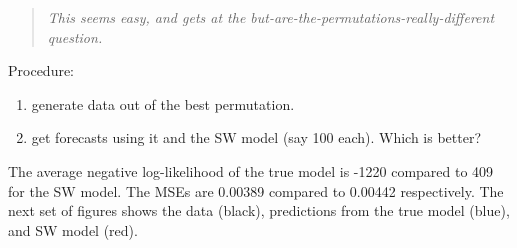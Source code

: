 \documentclass[]{article}
\providecommand{\tightlist}{%
  \setlength{\itemsep}{0pt}\setlength{\parskip}{0pt}}
\begin{document}
\begin{quotation} {\em This seems easy, and gets at the but-are-the-permutations-really-different question.}
\end{quotation}

Procedure:

\begin{enumerate}
\def\labelenumi{\arabic{enumi}.}
\tightlist
\item
  generate data out of the best permutation.
\item
  get forecasts using it and the SW model (say 100 each). Which is
  better?
\end{enumerate}

The average negative log-likelihood of the true model is -1220 compared
to 409 for the SW model. The MSEs are 0.00389 compared to 0.00442
respectively. The next set of figures shows the data (black),
predictions from the true model (blue), and SW model (red).
\end{document}
